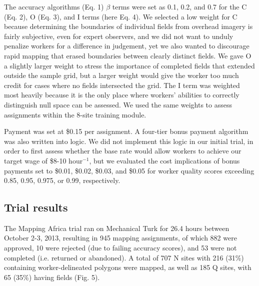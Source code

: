 \documentclass[preprint,12pt,authoryear]{elsarticle}
\begin{document}
The accuracy algorithms (Eq. 1) $\beta$ terms were set as 0.1, 0.2, and 0.7 for the C (Eq. 2), O (Eq. 3), and I terms (here Eq. 4). We selected a low weight for C because determining the boundaries of individual fields from overhead imagery is fairly subjective, even for expert observers, and we did not want to unduly penalize workers for a difference in judgement, yet we also wanted to discourage rapid mapping that erased boundaries between clearly distinct fields. We gave O a slightly larger weight to stress the importance of completed fields that extended outside the sample grid, but a larger weight would give the worker too much credit for cases where no fields intersected the grid. The I term was weighted most heavily because it is the only place where workers' abilities to correctly distinguish null space can be assessed.  We used the same weights to assess assignments within the 8-site training module.       

Payment was set at \$0.15 per assignment. A four-tier bonus payment algorithm was also written into logic. We did not implement this logic in our initial trial, in order to first assess whether the base rate would allow workers to achieve our target wage of \$8-10 hour$^{-1}$, but we evaluated the cost implications of bonus payments set to \$0.01, \$0.02, \$0.03, and \$0.05 for worker quality scores exceeding 0.85, 0.95, 0.975, or 0.99, respectively. 

\subsection{Trial results}
The Mapping Africa trial ran on Mechanical Turk for 26.4 hours between October 2-3, 2013, resulting in 945 mapping assignments, of which 882 were approved, 10 were rejected (due to failing accuracy scores), and 53 were not completed (i.e. returned or abandoned).  A total of 707 N sites with 216 (31\%) containing worker-delineated polygons were mapped, as well as 185 Q sites, with 65 (35\%) having fields (Fig. 5). 
\end{document}
